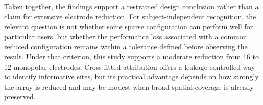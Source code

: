 Taken together, the findings support a restrained design conclusion rather than a claim for extensive electrode reduction. For subject-independent recognition, the relevant question is not whether some sparse configuration can perform well for particular users, but whether the performance loss associated with a common reduced configuration remains within a tolerance defined before observing the result. Under that criterion, this study supports a moderate reduction from 16 to 12 monopolar electrodes. Cross-fitted attribution offers a leakage-controlled way to identify informative sites, but its practical advantage depends on how strongly the array is reduced and may be modest when broad spatial coverage is already preserved.
